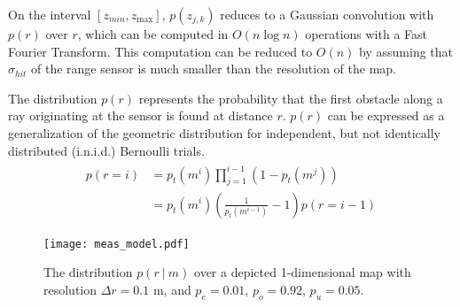 On the interval $\left[z_{min}, z_{\max}\right]$, $p(z_{j, k})$ reduces to a Gaussian convolution with $p(r)$ over $r$, which can be computed in $O(n \log n)$ operations with a Fast Fourier Transform. This computation can be reduced to $O(n)$ by assuming that $\sigma_{hit}$ of the range sensor is much smaller than the resolution of the map.

The distribution $p(r)$ represents the probability that the first obstacle along a ray originating at the sensor is found at distance $r$. $p(r)$ can be expressed as a generalization of the geometric distribution for independent, but not identically distributed (i.n.i.d.) Bernoulli trials.
%
\begin{align}
  \begin{split}
    p(r = i)
    &=
    p_{t}(m^i)
    \prod_{j=1}^{i-1}
    \left(
      1 - p_{t}(m^{j})
    \right)
    \\
    &=
    p_{t}(m^i)
    \left(
      \frac{1}{p_{t}(m^{i-1})} - 1
    \right)
    p(r = i - 1)
  \end{split}
\end{align}


\begin{figure}
  \centering
  \texttt{[image: meas\_model.pdf]}
  \caption{The distribution $p(r \ \vert \ m)$ over a depicted 1-dimensional map with resolution $\Delta r = 0.1$ m, and $p_{e} = 0.01$, $p_{o} = 0.92$, $p_{u} = 0.05$. \label{fig:measurement_model}}
\end{figure}

